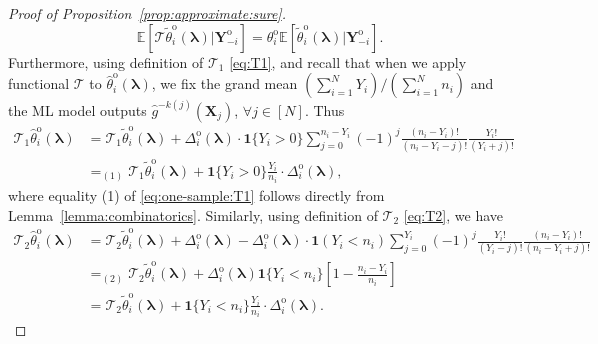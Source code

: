 \documentclass[12pt,letterpaper]{article}
\begin{document}
\begin{proof}[Proof of Proposition~\ref{prop:approximate:sure}]
\begin{equation}\label{eq:conditional:unbiased:one-sample}
\mathbb{E}\left[\mathcal{T}\tilde{\theta}_i^{\mathrm{o}}(\boldsymbol{\lambda})|\mathbf{Y}_{-i}^{\mathrm{o}}\right]=\theta_i^{\mathrm{o}}\mathbb{E}\left[\tilde{\theta}_i^{\mathrm{o}}(\boldsymbol{\lambda})|\mathbf{Y}_{-i}^{\mathrm{o}}\right].
\end{equation}
Furthermore, using definition of $\mathcal{T}_1$ \eqref{eq:T1}, and recall that when we apply functional $\mathcal{T}$ to $\hat{\theta}_i^{\mathrm{o}}(\boldsymbol{\lambda})$, we fix the grand mean $(\sum_{i=1}^NY_i)/(\sum_{i=1}^Nn_i)$ and the ML model outputs $\hat{g}^{-k(j)}(\mathbf{X}_j)$, $\forall j\in[N]$. Thus 
\begin{equation}\label{eq:one-sample:T1}
\begin{array}{rl}
\mathcal{T}_1\hat{\theta}_i^{\mathrm{o}}(\boldsymbol{\lambda})\!\!\!\!&\displaystyle=\mathcal{T}_1\tilde\theta_i^{\mathrm{o}}(\boldsymbol{\lambda})+\Delta_i^{\mathrm{o}}(\boldsymbol{\lambda})\cdot\mathbf{1}\{Y_i>0\}\sum_{j=0}^{n_i-Y_i}(-1)^{j}\frac{(n_i-Y_i)!}{(n_i-Y_i-j)!}\frac{Y_i!}{(Y_i+j)!}\\
&\displaystyle=_{(1)}\mathcal{T}_1\tilde\theta_i^{\mathrm{o}}(\boldsymbol{\lambda})+\mathbf{1}\{Y_i>0\}\frac{Y_i}{n_i}\cdot\Delta_i^{\mathrm{o}}(\boldsymbol{\lambda}),
\end{array}
\end{equation}
where equality (1) of \eqref{eq:one-sample:T1} follows directly from Lemma~\ref{lemma:combinatorics}. Similarly, using definition of $\mathcal{T}_2$ \eqref{eq:T2}, we have 
\begin{equation}\label{eq:one-sample:T2}
\begin{array}{rl}
\mathcal{T}_2\hat{\theta}_i^{\mathrm{o}}(\boldsymbol{\lambda})\!\!\!\!&\displaystyle=\mathcal{T}_2\tilde\theta_i^{\mathrm{o}}(\boldsymbol{\lambda})+\Delta_i^{\mathrm{o}}(\boldsymbol{\lambda})-\Delta_i^{\mathrm{o}}(\boldsymbol{\lambda})\cdot\mathbf{1}(Y_i < n_i)\sum_{j=0}^{Y_i}(-1)^{j}\frac{Y_i!}{(Y_i-j)!}\frac{(n_i - Y_i)!}{(n_i-Y_i+j)!}\\
&\displaystyle=_{(2)}\mathcal{T}_2\tilde\theta_i^{\mathrm{o}}(\boldsymbol{\lambda})+\Delta_i^{\mathrm{o}}(\boldsymbol{\lambda})\mathbf{1}\{Y_i < n_i\}\left[1-\frac{n_i-Y_i}{n_i}\right]\\
&\displaystyle=\mathcal{T}_2\tilde\theta_i^{\mathrm{o}}(\boldsymbol{\lambda})+\mathbf{1}\{Y_i < n_i\}\frac{Y_i}{n_i}\cdot\Delta_i^{\mathrm{o}}(\boldsymbol{\lambda}).
\end{array}

\end{equation}
\end{proof}
\end{document}
